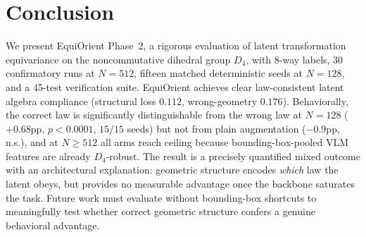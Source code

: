 \documentclass[10pt,twocolumn,letterpaper]{article}
\begin{document}
\section{Conclusion}

We present EquiOrient Phase~2, a rigorous evaluation of latent
transformation equivariance on the noncommutative dihedral group $D_4$,
with 8-way labels, 30 confirmatory runs at $N{=}512$, fifteen matched
deterministic seeds at $N{=}128$, and a 45-test verification suite.
EquiOrient achieves clear law-consistent latent algebra compliance
(structural loss $0.112$, wrong-geometry $0.176$). Behaviorally, the
correct law is significantly distinguishable from the wrong law at
$N{=}128$ ($+0.68$pp, $p<0.0001$, $15/15$ seeds) but not from plain
augmentation ($-0.9$pp, n.s.), and at $N \geq 512$ all arms reach
ceiling because bounding-box-pooled VLM features are already
$D_4$-robust. The result
is a precisely quantified mixed outcome with an architectural
explanation: geometric structure encodes \emph{which} law the latent
obeys, but provides no measurable advantage once the backbone
saturates the task. Future work must evaluate without bounding-box
shortcuts to meaningfully test whether correct geometric structure
confers a genuine behavioral advantage.

{\small


}
\end{document}
